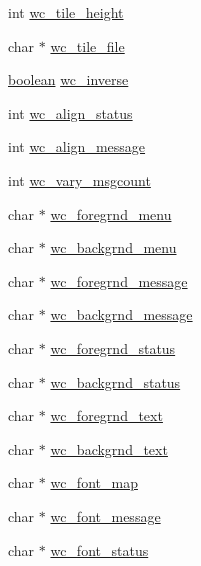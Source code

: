 \begin{DoxyCompactItemize}
\item 
int \hyperlink{structinstance__flags_ac52623febbb46475512c5b3e1cb1d3d7}{wc\+\_\+tile\+\_\+height}
\item 
char $\ast$ \hyperlink{structinstance__flags_a124beae6172167923de264a085b8bae4}{wc\+\_\+tile\+\_\+file}
\item 
\hyperlink{global_8h_a531b10dd351aa162d7dcccd1966308b8}{boolean} \hyperlink{structinstance__flags_a6aa2cebb9cd28d62a78a78647eb8e7c9}{wc\+\_\+inverse}
\item 
int \hyperlink{structinstance__flags_a59e71b710998b8e0a611d775cee0dded}{wc\+\_\+align\+\_\+status}
\item 
int \hyperlink{structinstance__flags_a1072207cf89377c1bf7a1891be5f66da}{wc\+\_\+align\+\_\+message}
\item 
int \hyperlink{structinstance__flags_a5dae0b9030e73537ec058bfb1b5f0291}{wc\+\_\+vary\+\_\+msgcount}
\item 
char $\ast$ \hyperlink{structinstance__flags_a4854ab0ecbaf931d125e8ddf187bcaa8}{wc\+\_\+foregrnd\+\_\+menu}
\item 
char $\ast$ \hyperlink{structinstance__flags_ae5094152d080f61309e0bd0bf663fa46}{wc\+\_\+backgrnd\+\_\+menu}
\item 
char $\ast$ \hyperlink{structinstance__flags_a31d2ba572a9da80bba15387b0ebb29c2}{wc\+\_\+foregrnd\+\_\+message}
\item 
char $\ast$ \hyperlink{structinstance__flags_a0d75ca0bd6d66c064a8a886fbf2982fb}{wc\+\_\+backgrnd\+\_\+message}
\item 
char $\ast$ \hyperlink{structinstance__flags_ab245859108fb1a411f0d98495eee3c7f}{wc\+\_\+foregrnd\+\_\+status}
\item 
char $\ast$ \hyperlink{structinstance__flags_acacbb00c74728d404a78dc70f76710a5}{wc\+\_\+backgrnd\+\_\+status}
\item 
char $\ast$ \hyperlink{structinstance__flags_ac91fe1569b4bfb4746b6531a98577b86}{wc\+\_\+foregrnd\+\_\+text}
\item 
char $\ast$ \hyperlink{structinstance__flags_a82623e4be9e2d9e800057ab9dee47186}{wc\+\_\+backgrnd\+\_\+text}
\item 
char $\ast$ \hyperlink{structinstance__flags_aa6ea2de4586a805d461b0a92a229b7a8}{wc\+\_\+font\+\_\+map}
\item 
char $\ast$ \hyperlink{structinstance__flags_a1cd982dcf1dd4bebc211a2d38dc74eea}{wc\+\_\+font\+\_\+message}
\item 
char $\ast$ \hyperlink{structinstance__flags_a6b5bba710c4e80b026a4c1e77d015489}{wc\+\_\+font\+\_\+status}

\end{DoxyCompactItemize}
